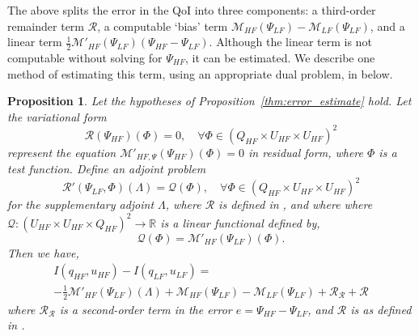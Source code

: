 \documentclass[review,sort&compress]{elsarticle}
\newcommand{\R}{{\mathbb{R}}}
\newcommand{\red}[1]{{\color{red}{#1}}}
\theoremstyle{plain} %
\newtheorem{proposition}{Proposition}
\theoremstyle{definition} %
\begin{document}
The above  splits the error in the QoI into three components: a third-order remainder term $\mathcal{R}$, a computable `bias' term $\mathcal{M}_{HF}(\Psi_{LF})-\mathcal{M}_{LF}(\Psi_{LF})$, and a linear term $\frac{1}{2}\mathcal{M}'_{HF}(\Psi_{LF})(\Psi_{HF}-\Psi_{LF})$. Although the linear term is not computable without solving for $\Psi_{HF}$, it can be estimated. We describe one method of estimating this term, using an appropriate dual problem, in  below.

%
\begin{proposition}
\label{thm:error_estimate_dual}
Let the hypotheses of Proposition~\ref{thm:error_estimate} hold. Let the variational form
%
\begin{equation}
\mathscr{R}(\Psi_{HF})(\Phi)=0,\quad\forall\Phi\in(Q_{HF}\times U_{HF}\times U_{HF})^2
\label{eq:supadjsys_prop}
\end{equation}
%
represent the equation $\mathcal{M}'_{HF,\Psi}(\Psi_{HF})(\Phi)=0$ in residual form, where $\Phi$ is a test function. Define an adjoint problem
%
\begin{equation}
\mathscr{R}'(\Psi_{LF},\Phi)(\Lambda)=\mathcal{Q}(\Phi),\quad\forall\Phi\in(Q_{HF}\times U_{HF}\times U_{HF})^2
\label{eq:superAdjEq}
\end{equation}
for the supplementary adjoint $\Lambda$, where $\mathscr{R}$ is defined in , and where
%
%
where $\mathcal{Q}:(U_{HF} \times U_{HF} \times Q_{HF})^2 \to \R$ is a linear functional defined by,
%
\begin{equation}
\mathcal{Q}(\Phi)=\mathcal{M}'_{HF}(\Psi_{LF})(\Phi).
\label{eq:supadjout}
\end{equation}
%
Then we have,
%
\begin{multline}
\label{eq:finErrExp}
I(q_{HF},u_{HF})-I(q_{LF},u_{LF})=\\-\frac{1}{2}\mathcal{M}'_{HF}(\Psi_{LF})(\Lambda)+\mathcal M_{HF}(\Psi_{LF})-\mathcal M_{LF}(\Psi_{LF}) + \mathcal{R}_{\mathscr{R}} + \mathcal{R}
\end{multline}
%
where $\mathcal{R}_{\mathscr{R}}$ is a second-order term in the error $e=\Psi_{HF}-\Psi_{LF}$, and $\mathcal{R}$ is as defined in . %
%
\end{proposition}
\end{document}
